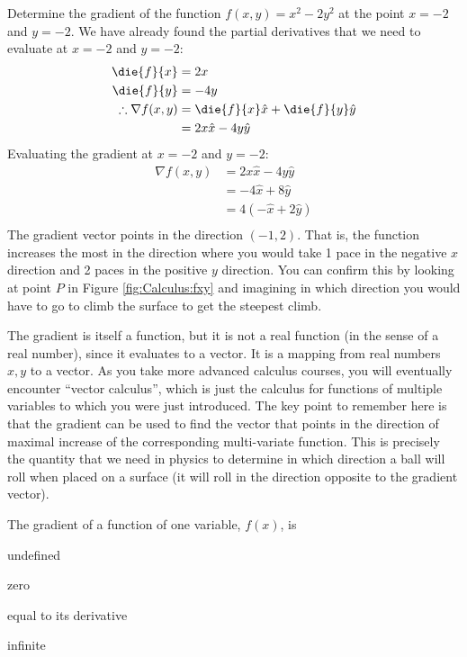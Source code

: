 \begin{example}{Determine the gradient of the function $f(x,y)=x^2-2y^2$ at the point $x=-2$ and $y=-2$.}
We have already found the partial derivatives that we need to evaluate at $x=-2$ and $y=-2$:
\begin{align*}
\die{f}{x}&= 2x\\
\die{f}{y}&= -4y \\
\therefore \nabla f(x,y) &= \die{f}{x}\hat x+\die{f}{y} \hat y \\
&=2x\hat x-4y\hat y
\end{align*}
Evaluating the gradient at $x=-2$ and $y=-2$:
\begin{align*}
\nabla f(x,y) &= 2x\hat x-4y\hat y\\
&=-4 \hat x + 8 \hat y\\
&=4 (-\hat x+2\hat y)\\
\end{align*}
The gradient vector points in the direction $(-1,2)$. That is, the function increases the most in the direction where you would take 1 pace in the negative $x$ direction and 2 paces in the positive $y$ direction. You can confirm this by looking at point $P$ in Figure \ref{fig:Calculus:fxy} and imagining in which direction you would have to go to climb the surface to get the steepest climb.
\end{example}

The gradient is itself a function, but it is not a real function (in the sense of a real number), since it evaluates to a vector. It is a mapping from real numbers $x,y$ to a vector. As you take more advanced calculus courses, you will eventually encounter ``vector calculus'', which is just the calculus for functions of multiple variables to which you were just introduced. The key point to remember here is that the gradient can be used to find the vector that points in the direction of maximal increase of the corresponding multi-variate function. This is precisely the quantity that we need in physics to determine in which direction a ball will roll when placed on a surface (it will roll in the direction opposite to the gradient vector).

\begin{checkpoint}
\begin{MCquestion}{The gradient of a function of one variable, $f(x)$, is}
\item undefined
\item zero
\item equal to its derivative  \correct
\item infinite
\end{MCquestion}
\end{checkpoint}

